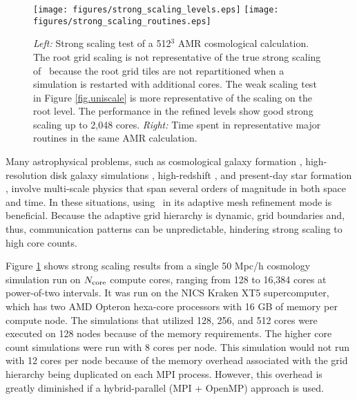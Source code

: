 \begin{figure}
\begin{center}
\texttt{[image: figures/strong\_scaling\_levels.eps]}
\hfill
\texttt{[image: figures/strong\_scaling\_routines.eps]}
\end{center}
\caption{\emph{Left:} Strong scaling test of a 512$^3$ AMR
cosmological calculation.  The root grid scaling is not representative
of the true strong scaling of \enzo\ because the root grid tiles are
not repartitioned when a simulation is restarted with additional
cores.  The weak scaling test in Figure \ref{fig.uniscale} is more
representative of the scaling on the root level.  The performance in
the refined levels show good strong scaling up to 2,048 cores.
\emph{Right:} Time spent in representative major routines in the same
AMR calculation.}
\label{fig:strong_scaling}
\end{figure}

Many astrophysical problems, such as cosmological galaxy formation
\citep{2012ApJ...749..140H}, high-resolution disk galaxy simulations
\citep{2011ApJ...738...54K}, high-redshift
\citep{2009Sci...325..601T}, and present-day star formation
\citep{Collins12a}, involve multi-scale physics that span several
orders of magnitude in both space and time.  In these situations,
using \enzo\ in its adaptive mesh refinement mode is beneficial.
Because the adaptive grid hierarchy is dynamic, grid boundaries and,
thus, communication patterns can be unpredictable, hindering strong
scaling to high core counts.

Figure \ref{fig:strong_scaling} shows strong scaling results from a
single 50 Mpc/h cosmology simulation run on $N_{\rm core}$ compute
cores, ranging from 128 to 16,384 cores at power-of-two intervals.  It
was run on the NICS Kraken XT5 supercomputer, which has two AMD
Opteron hexa-core processors with 16 GB of memory per compute node.
The simulations that utilized 128, 256, and 512 cores were executed on
128 nodes because of the memory requirements.  The higher core count
simulations were run with 8 cores per node.  This simulation would not
run with 12 cores per node because of the memory overhead associated
with the grid hierarchy being duplicated on each MPI process.
However, this overhead is greatly diminished if a hybrid-parallel (MPI
+ OpenMP) approach is used.

